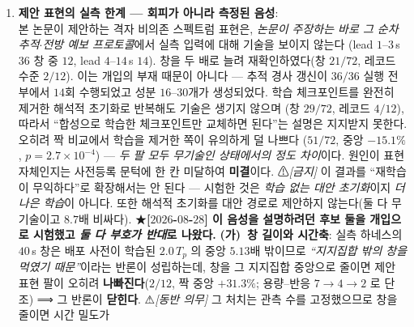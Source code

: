 \documentclass[11pt]{report}
\numberwithin{equation}{chapter}
\numberwithin{figure}{chapter}
\numberwithin{table}{chapter}
\begin{document}
\begin{enumerate}
  \item \textbf{제안 표현의 실측 한계 --- 회피가 아니라 측정된 음성}: \\
        본 논문이 제안하는 격자 비의존 스펙트럼 표현은, \emph{논문이 주장하는 바로 그
        순차 추적$\cdot$전방 예보 프로토콜}에서 실측 입력에 대해 기술을 보이지 않는다
        (lead $1$--$3$\,s $36$ 창 중 $12$, lead $4$--$14$\,s $14$). 창을 두 배로 늘려
        재확인하였다(창 $21/72$, 레코드 수준 $2/12$). 이는 개입의 부재 때문이 아니다 ---
        추적 경사 갱신이 $36/36$ 실행 전부에서 $14$회 수행되었고 성분 $16$--$30$개가 생성되었다.
        학습 체크포인트를 완전히 제거한 해석적 초기화로 반복해도 기술은 생기지 않으며
        (창 $29/72$, 레코드 $4/12$), 따라서 ``합성으로 학습한 체크포인트만 교체하면 된다''는
        설명은 지지받지 못한다. 오히려 짝 비교에서 학습을 제거한 쪽이 유의하게 덜 나쁘다
        ($51/72$, 중앙 $-15.1\%$, $p=2.7\times10^{-4}$) --- \emph{두 팔 모두 무기술인 상태에서의
        정도 차이}이다. 원인이 표현 자체인지는 사전등록 문턱에 한 칸 미달하여 \textbf{미결}이다.
        ⚠\emph{[금지]} 이 결과를 ``재학습이 무익하다''로 확장해서는 안 된다 --- 시험한 것은
        \emph{학습 없는 대안 초기화}이지 \emph{더 나은 학습}이 아니다. 또한 해석적 초기화를
        대안 경로로 제안하지 않는다(둘 다 무기술이고 $8.7$배 비싸다).
        ★\textbf{[$2026$-$08$-$28$] 이 음성을 설명하려던 후보 둘을 개입으로 시험했고
        \emph{둘 다 부호가 반대}로 나왔다.} \textbf{(가)~창 길이와 시간축}: 실측 하네스의
        $40$\,s 창은 배포 사전이 학습된 $2.0\,T_p$ 의 중앙 $5.13$배 밖이므로
        \emph{``지지집합 밖의 창을 먹였기 때문''}이라는 반론이 성립하는데, 창을 그
        지지집합 중앙으로 줄이면 제안 표현 팔이 오히려 \textbf{나빠진다}($2/12$, 짝 중앙
        $+31.3\%$; 용량--반응 $7 \to 4 \to 2$ 로 단조) ⟹ 그 반론이 \textbf{닫힌다}.
        ⚠\emph{[동반 의무]} 그 처치는 관측 수를 고정했으므로 창을 줄이면 시간 밀도가

\end{enumerate}
\end{document}
